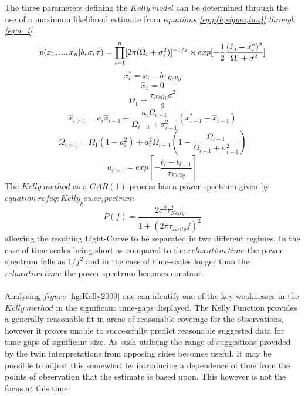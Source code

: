\documentclass[a4paper, 12pt, twoside]{article}
\begin{document}
\noindent The three parameters defining the $Kelly \ model$ can be determined through the use of a maximum likelihood estimate from \emph{equations \ref{eq:p(b,sigma,tau)} through \ref{eq:a_i}}.
\begin{equation}
p(x_{1},...,x_{n}|b,\sigma,\tau) = \prod_{\mathclap{i=1}}^{\mathclap{n}}[2\pi(\Omega_{i}+\sigma_{i}^{2})]^{-1/2}\times exp[-\frac{1}{2}\frac{(\hat{x}_{i}-x_{i}^{*})^{2}}{\Omega_{i}+\sigma^{2}}]
\label{eq:p(b,sigma,tau)}
\end{equation}
\begin{equation}
x_{i}^{*} = x_{i}-b\tau_{Kelly}
\label{eq:x_star}
\end{equation} 
\begin{equation}
\hat{x}_{1} = 0
\label{eq:x_hat_1}
\end{equation} 
\begin{equation}
\Omega_{1} = \frac{\tau_{Kelly}\sigma^{2}}{2}
\label{eq:Omega_1}
\end{equation}
\begin{equation}
\hat{x}_{i>1} = a_{i}\hat{x}_{i-1}+\frac{a_{i}\Omega_{i-1}}{\Omega_{i-1}+\sigma_{i-1}^{2}}(x_{i-1}^{*}-\hat{x}_{i-1})
\label{eq:x_hat_i}
\end{equation}
\begin{equation}
\Omega_{i>1} = \Omega_{1}(1-a_{i}^{2})+a_{i}^{2}\Omega_{i-1}(1-\frac{\Omega_{i-1}}{\Omega_{i-1}+\sigma_{i-1}^{2}})
\label{eq:Omega_i}
\end{equation}
\begin{equation}
a_{i>1} = exp[-\frac{t_{i}-t_{i-1}}{\tau_{Kelly}}]
\label{eq:a_i}
\end{equation}
The $Kelly \ method$ as a $CAR(1)$ process has a power spectrum given by $equation \ ref{eq:Kelly_power_spectrum}$
\begin{equation}
P(f) = \frac{2\sigma^{2}\tau_{Kelly}^{2}}{1+(2\pi\tau_{Kelly}f)^{2}}
\label{eq:Kelly_power_spectrum}
\end{equation}
allowing the resulting Light-Curve to be separated in two different regimes. In the case of time-scales being short as compared to the $relaxation \ time$ the power spectrum falls as $1/f^{2}$ and in the case of time-scales longer than the $relaxation \ time$ the power spectrum becomes constant.  \\
\\
Analysing $figure$ \ref{fig:Kelly2009} one can identify one of the key weaknesses in the $Kelly \ method$ in the significant time-gaps displayed. The Kelly Function provides a generally reasonable fit in areas of reasonable coverage for the observations, however it proves unable to successfully predict reasonable suggested data for time-gaps of significant size. As such utilising the range of suggestions provided by the twin interpretations from opposing sides becomes useful. It may be possible to adjust this somewhat by introducing a dependence of time from the points of observation that the estimate is based upon. This however is not the focus at this time. 
\end{document}

